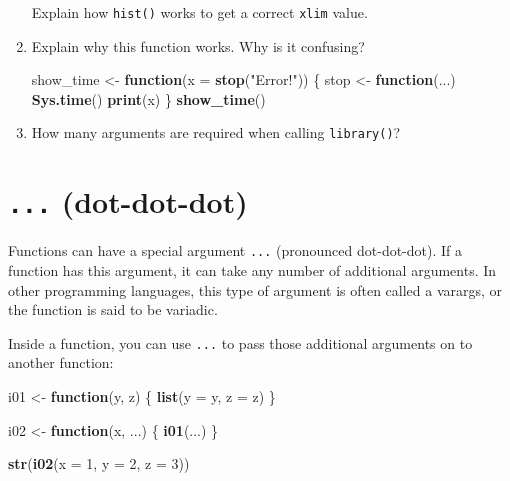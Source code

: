 \documentclass[]{book}
\newenvironment{Shaded}{\begin{snugshade}}{\end{snugshade}}
\newcommand{\KeywordTok}[1]{\textcolor[rgb]{0.13,0.29,0.53}{\textbf{#1}}}
\newcommand{\DataTypeTok}[1]{\textcolor[rgb]{0.13,0.29,0.53}{#1}}
\newcommand{\DecValTok}[1]{\textcolor[rgb]{0.00,0.00,0.81}{#1}}
\newcommand{\StringTok}[1]{\textcolor[rgb]{0.31,0.60,0.02}{#1}}
\newcommand{\ControlFlowTok}[1]{\textcolor[rgb]{0.13,0.29,0.53}{\textbf{#1}}}
\newcommand{\NormalTok}[1]{#1}
\theoremstyle{definition}
\theoremstyle{definition}
\theoremstyle{definition}
\theoremstyle{remark}
\begin{document}
\begin{enumerate}
  Explain how \texttt{hist()} works to get a correct \texttt{xlim}
  value.
\item
  Explain why this function works. Why is it confusing?

\begin{Shaded}
\begin{Highlighting}[]
\NormalTok{show_time <-}\StringTok{ }\ControlFlowTok{function}\NormalTok{(}\DataTypeTok{x =} \KeywordTok{stop}\NormalTok{(}\StringTok{"Error!"}\NormalTok{)) \{}
\NormalTok{  stop <-}\StringTok{ }\ControlFlowTok{function}\NormalTok{(...) }\KeywordTok{Sys.time}\NormalTok{()}
  \KeywordTok{print}\NormalTok{(x)}
\NormalTok{\}}
\KeywordTok{show_time}\NormalTok{()}
\end{Highlighting}
\end{Shaded}
\item
  How many arguments are required when calling \texttt{library()}?
\end{enumerate}

\section{\texorpdfstring{\texttt{...}
(dot-dot-dot)}{... (dot-dot-dot)}}\label{fun-dot-dot-dot}

Functions can have a special argument \texttt{...} (pronounced
dot-dot-dot). If a function has this argument, it can take any number of
additional arguments. In other programming languages, this type of
argument is often called a varargs, or the function is said to be
variadic.

Inside a function, you can use \texttt{...} to pass those additional
arguments on to another function:

\begin{Shaded}
\begin{Highlighting}[]
\NormalTok{i01 <-}\StringTok{ }\ControlFlowTok{function}\NormalTok{(y, z) \{}
  \KeywordTok{list}\NormalTok{(}\DataTypeTok{y =}\NormalTok{ y, }\DataTypeTok{z =}\NormalTok{ z)}
\NormalTok{\}}

\NormalTok{i02 <-}\StringTok{ }\ControlFlowTok{function}\NormalTok{(x, ...) \{}
  \KeywordTok{i01}\NormalTok{(...)}
\NormalTok{\}}

\KeywordTok{str}\NormalTok{(}\KeywordTok{i02}\NormalTok{(}\DataTypeTok{x =} \DecValTok{1}\NormalTok{, }\DataTypeTok{y =} \DecValTok{2}\NormalTok{, }\DataTypeTok{z =} \DecValTok{3}\NormalTok{))}
\end{Highlighting}
\end{Shaded}
\end{document}
